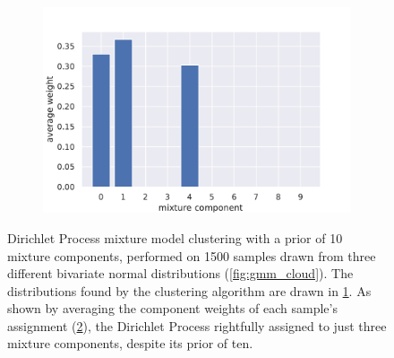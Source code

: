 \begin{figure}[tbp]
\begin{subfigure}[b]{0.49\textwidth}
    \caption{\label{fig:gmm_dist}}
  \end{subfigure}
  \begin{subfigure}[b]{0.75\textwidth}
    \includegraphics[width=\textwidth]{figures/gmm_assignments.pdf}
    \caption{\label{fig:gmm_ass}}
  \end{subfigure}
  \caption{Dirichlet Process mixture model clustering with a prior of 10 mixture
    components, performed on 1500 samples drawn from three different bivariate
    normal distributions (\cref{fig:gmm_cloud}). The distributions found by the
    clustering algorithm are drawn in \cref{fig:gmm_dist}. As shown by averaging
    the component weights of each sample's assignment (\cref{fig:gmm_ass}), the
    Dirichlet Process rightfully assigned to just three mixture components,
  despite its prior of ten.\label{fig:gmm_example}}
\end{figure}

